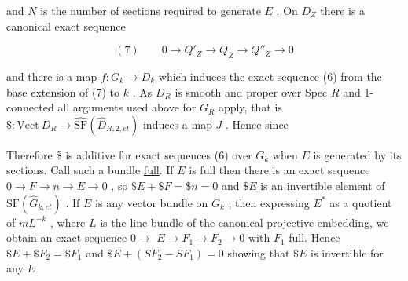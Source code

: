 
and $N$ is the number of sections required to generate $E$ . On
$D_Z$ there is a canonical exact sequence

\[ (7) \qquad 0 \to Q'_Z \to Q_Z \to Q''_Z \to 0 \]

and there is a map $f:G_k \to D_k$ which induces the exact sequence
(6) from the base extension of (7) to $k$ . As $D_R$ is smooth and
proper over Spec $R$ and 1-connected all arguments used above for
$G_R$ apply, that is $\$:\mathrm{Vect}\ D_R \to \hat{\mathrm{SF}}(\hat{D}_{R,2,et})$ induces a map $J$ .
Hence since


Therefore $\$$ is additive for exact sequences (6) over $G_k$
when $E$ is generated by its sections. Call such a bundle \uline{full}.
If $E$ is full then there is an exact sequence $0 \to F \to n \to E \to 0$ ,
so $\$E + \$F = \$n = 0$ and $\$E$ is an invertible element of
$\mathrm{SF}(\hat{G}_{k,et})$ . If $E$ is any vector bundle on $G_k$ , then expressing
$E^*$ as a quotient of $mL^{-k}$ , where $L$ is the line bundle of the
canonical projective embedding, we obtain an exact sequence $0 \to$
$E \to F_1 \to F_2 \to 0$ with $F_1$ full. Hence $\$E + \$F_2 = \$F_1$ and
$\$E + (SF_2 - SF_1) = 0$ showing that $\$E$ is invertible for any $E$

